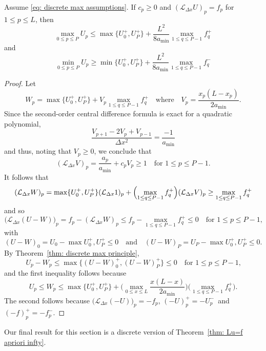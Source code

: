 \begin{theorem}
Assume \eqref{eq: discrete max assumptions}.
If $c_p\ge0$ and $(\mathcal{L}_{\Delta x}U)_p=f_p$ for $1\le p\le L$, then
\[
\max_{0\le p\le P}U_p\le\max\{U^+_0,U^+_P\}+\frac{L^2}{8a_{\min}}
	\max_{1\le q\le P-1}f_q^+
\]
and
\[
\min_{0\le p\le P}U_p\ge\min\{U^+_0,U^+_P\}+\frac{L^2}{8a_{\min}}
	\max_{1\le q\le P-1}f_q^-
\]
\end{theorem}
\begin{proof}
Let 
\[
W_p=\max\{U^+_0,U^+_P\}+V_p\max_{1\le q\le P-1}f_q^+
\quad\text{where}\quad
V_p=\frac{x_p(L-x_p)}{2a_{\min}}.
\]
Since the second-order central difference formula is exact for a quadratic 
polynomial,
\[
\frac{V_{p+1}-2V_p+V_{p-1}}{\Delta x^2}=\frac{-1}{a_{\min}}
\]
and thus, noting that $V_p\ge0$, we conclude that
\[
(\mathcal{L}_{\Delta x}V)_p=\frac{a_p}{a_{\min}}+c_pV_p\ge1
	\quad\text{for $1\le p\le P-1$.}
\]
It follows that
\[
(\mathcal{L}_{\Delta x}W)_p=\max\{U^+_0,U^+_P\}(\mathcal{L}_{\Delta x}1)_p
	+\Bigl(\max_{1\le q\le P-1}f_q^+\Bigr)(\mathcal{L}_{\Delta x}V)_p
	\ge\max_{1\le q\le P-1}f_q^+
\]
and so
\[
\bigl(\mathcal{L}_{\Delta x}(U-W)\bigr)_p=f_p-(\mathcal{L}_{\Delta x}W)_p
	\le f_p-\max_{1\le q\le P-1}f_q^+\le0\quad\text{for $1\le p\le P-1$,}
\]
with
\[
(U-W)_0=U_0-\max{U_0^+,U_P^+}\le0
\quad\text{and}\quad
(U-W)_P=U_P-\max{U_0^+,U_P^+}\le0.
\]
By Theorem~\ref{thm: discrete max principle},
\[
U_p-W_p\le\max\{(U-W)_0^+,(U-W)_P^+\}\le0\quad\text{for $1\le p\le P-1$,}
\]
and the first inequality follows because
\[
U_p\le W_p\le\max\{U^+_0,U^+_P\}
	+\biggl(\max_{0\le x\le L}\frac{x(L-x)}{2a_{\min}}\biggr)
	\biggl(\max_{1\le q\le P-1}f_q^+\biggr). 
\]
The second follows because $\bigl(\mathcal{L}_{\Delta x}(-U)\bigr)_p=-f_p$,
$(-U)_p^+=-U_p^-$~and $(-f)_p^+=-f_p^-$.
\end{proof}

Our final result for this section is a discrete version of 
Theorem~\ref{thm: Lu=f apriori infty}.

